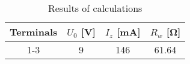\begin{table}[hptb]
	\centering
	\caption{Results of calculations}
	\label{tab:tab1}
	\begin{tabular}{|c|c|c|c|}
		\hline
		Terminals & $U_0$ [\unit{\volt}] & $I_z$ [\unit{\milli\ampere}] & $R_w$ [\unit{\ohm}] \\
		\hline
		1-3 & 9 & 146 & 61.64\\
		\hline
	\end{tabular}
\end{table}